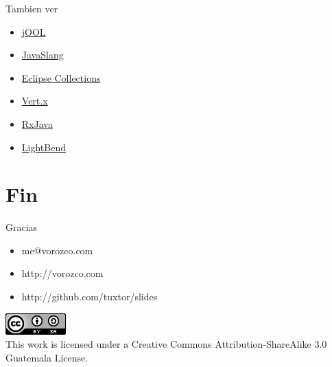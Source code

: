 \documentclass{beamer}
\begin{document}
\begin{frame}{Tambien ver}
    \begin{itemize}
        \item \href{https://github.com/jOOQ/jOOL}{jOOL}
        \item \href{http://www.javaslang.io/}{JavaSlang}
        \item \href{https://projects.eclipse.org/proposals/eclipse-collections}{Eclipse Collections}
        
        \item \href{http://vertx.io/}{Vert.x}
        \item \href{https://github.com/ReactiveX/RxJava}{RxJava}
        \item \href{https://www.lightbend.com/}{LightBend}
    \end{itemize}
\end{frame}


\section{Fin}

\begin{frame}{Gracias}
\begin{itemize}
\item me@vorozco.com
\item http://vorozco.com
\item http://github.com/tuxtor/slides
\end{itemize}
\begin{center}
\includegraphics[width=0.1\linewidth]{Images/cclogo}
\\
This work is licensed under a Creative Commons Attribution-ShareAlike 3.0 Guatemala License.
\end{center}
\end{frame}
\end{document}
